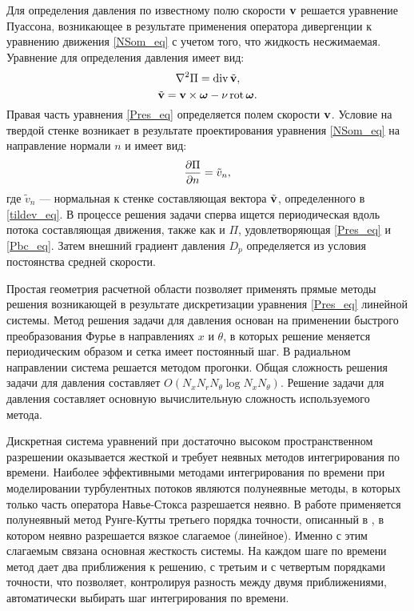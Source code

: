 Для определения давления по известному полю скорости $\mathbf{v}$ решается уравнение Пуассона, возникающее в результате применения оператора дивергенции к уравнению движения \eqref{NSom_eq} с учетом того, что жидкость несжимаемая. Уравнение для определения давления имеет вид:
\begin{equation}\label{Pres_eq}
\nabla^2 \Pi = \mathop{}\!\operatorname{div} \tilde {\mathbf{v}},
\end{equation}
\begin{equation}\label{tildev_eq}
\tilde {\mathbf{v}} =  \mathbf{v} \times \mbox{\boldmath$\omega$} - \nu \mathop{}\!\operatorname{rot} \mbox{\boldmath$\omega$}.
\end{equation}
Правая часть уравнения \eqref{Pres_eq} определяется полем скорости $\mathbf{v}$. Условие на твердой стенке возникает в результате проектирования уравнения \eqref{NSom_eq} на направление нормали $n$ и имеет вид:
\begin{equation}\label{Pbc_eq}
\frac{\partial \Pi}{\partial n} = \tilde v_n,
\end{equation}
где $\tilde v_n$ --- нормальная к стенке составляющая вектора $\tilde{\mathbf{v}}$, определенного в \eqref{tildev_eq}. В процессе решения задачи сперва ищется периодическая вдоль потока составляющая движения, также как и $\Pi$, удовлетворяющая \eqref{Pres_eq} и \eqref{Pbc_eq}. Затем внешний градиент давления $D_p$ определяется из условия постоянства средней скорости. 


Простая геометрия расчетной области позволяет применять прямые методы решения возникающей в результате дискретизации уравнения \eqref{Pres_eq} линейной системы. Метод решения задачи для давления основан на применении быстрого преобразования Фурье в направлениях $x$ и $\theta$, в которых решение меняется периодическим образом и сетка имеет постоянный шаг. В радиальном направлении система решается методом прогонки. Общая сложность решения задачи для давления составляет $O(N_x N_r N_\theta \log N_x N_\theta)$. Решение задачи для давления составляет основную вычислительную сложность используемого метода. 

Дискретная система уравнений при достаточно высоком пространственном разрешении оказывается жесткой и требует неявных методов интегрирования по времени. Наиболее эффективными методами интегрирования по времени при моделировании турбулентных потоков являются полунеявные методы, в которых только часть оператора Навье-Стокса разрешается неявно. В работе применяется полунеявный метод Рунге-Кутты третьего порядка точности, описанный в \cite{Nikitin2006third}, в котором неявно разрешается вязкое слагаемое (линейное). Именно с этим слагаемым связана основная жесткость системы. На каждом шаге по времени метод дает два приближения к решению, с третьим и с четвертым порядками точности, что позволяет, контролируя разность между двумя приближениями, автоматически выбирать шаг интегрирования по времени. 


